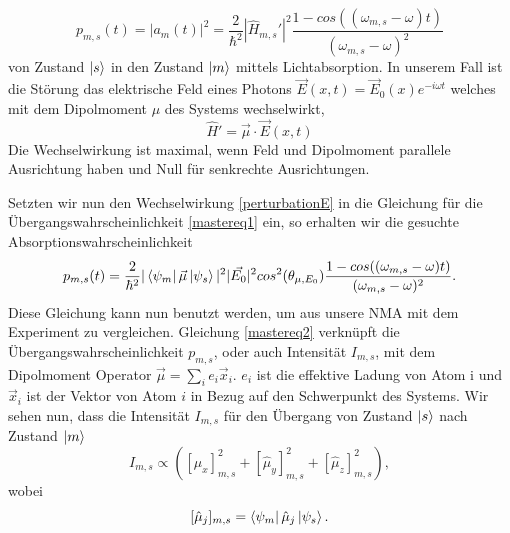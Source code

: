 \documentclass[a4paper,12pt]{article}
\begin{document}
\begin{equation}\label{mastereq1}
 p_{m,s}(t)=|a_m(t)|^2 = \frac{2}{\hbar^2}|\hat{H}_{m,s}'|^2 \frac{1-cos((\omega_{m,s}-\omega) t)}{(\omega_{m,s}-\omega)^2}
\end{equation}
von Zustand $\ket{s}$ in den Zustand $\ket{m}$ mittels Lichtabsorption. 
In unserem Fall ist die Störung das elektrische Feld eines Photons $\vec{E}(x,t)=\vec{E}_0(x)e^{-i\omega t}$ welches mit dem Dipolmoment $\mu$ des Systems wechselwirkt,
\begin{equation}\label{perturbationE}
\hat{H}'=\vec{\mu}\cdot \vec{E}(x,t) 
\end{equation}
Die Wechselwirkung ist maximal, wenn Feld und Dipolmoment parallele Ausrichtung haben und Null für senkrechte Ausrichtungen. 

Setzten wir nun den Wechselwirkung \ref{perturbationE} in die Gleichung für die Übergangswahrscheinlichkeit \ref{mastereq1} ein, so erhalten wir die gesuchte Absorptionswahrscheinlichkeit
\begin{equation}\label{mastereq2}
 p_{m,s}(t)= \frac{2}{\hbar^2}|\bra{\psi_m} \vec{\mu} \ket{\psi_s} |^2 |\vec{E_0}|^2 cos^2(\theta_{\mu,E_0}) \frac{1-cos((\omega_{m,s}-\omega) t)}{(\omega_{m,s}-\omega)^2}.
\end{equation}
Diese Gleichung kann nun benutzt werden, um aus unsere NMA mit dem Experiment zu vergleichen.
Gleichung \ref{mastereq2} verknüpft die Übergangswahrscheinlichkeit $p_{m,s}$, oder auch Intensität $I_{m,s}$, mit dem Dipolmoment Operator $\vec{\mu}=\sum_i e_i \vec{x}_i$. $e_i$ 
ist die effektive Ladung von Atom i und $\vec{x}_i$ ist der Vektor von Atom $i$ in Bezug auf den Schwerpunkt des Systems. 
Wir sehen nun, dass die Intensität $I_{m,s}$ für den Übergang von Zustand $\ket{s}$ nach Zustand $\ket{m}$ 
\begin{equation}\label{intensityeq1}
 I_{m,s} \varpropto \left( [\hat{\mu}_x]^2_{m,s} + [\hat{\mu}_y]^2_{m,s} + [\hat{\mu}_z]^2_{m,s} \right),
\end{equation}
wobei
\begin{equation}\label{dipl1}
[\hat{\mu}_j]_{m,s}=\bra{\psi_m}\hat{\mu}_j \ket{\psi_s}. 
\end{equation}
\end{document}
